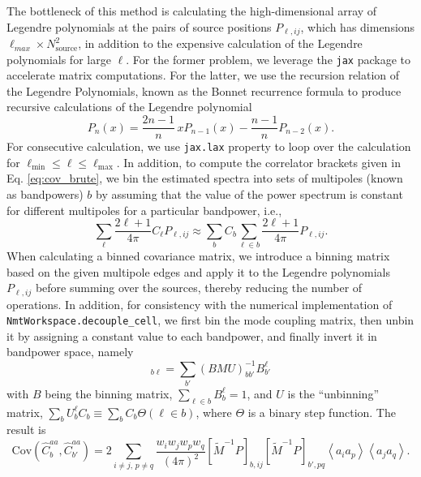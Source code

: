 \documentclass[%
 reprint,
superscriptaddress,
nofootinbib,
 amsmath,amssymb,
 aps,
 prd,
]{revtex4-2}
\begin{document}
The bottleneck of this method is calculating the high-dimensional array of Legendre polynomials at the pairs of source positions $P_{\ell, ij}$, which has dimensions $\ell_{max} \times N_{\text{source}}^2$, in addition to the expensive calculation of the Legendre polynomials for large $\ell$. For the former problem, we leverage the \texttt{jax} package to accelerate matrix computations. For the latter, we use the recursion relation of the Legendre Polynomials, known as the Bonnet recurrence formula  to produce recursive calculations of the Legendre polynomial \citep{Hademenos_Spiegel_Liu_2001}
\begin{equation}
    P_{n}(x) = \frac{2n-1}{n} \, x P_{n-1}(x) - \frac{n - 1}{n} P_{n-2}(x).
\end{equation}
For consecutive calculation, we use \texttt{jax.lax} property to loop over the calculation for $\ell_\mathrm{min} \leq \ell \leq \ell_\mathrm{max}$. In addition, to compute the correlator brackets given in Eq. \ref{eq:cov_brute}, we bin the estimated spectra into sets of multipoles (known as bandpowers) $b$ by assuming that the value of the power spectrum is constant for different multipoles for a particular bandpower, i.e.,
\begin{equation}
    \sum_{\ell} \frac{2\ell+1}{4\pi} C_\ell P_{\ell,ij}  \approx \sum_{b} C_b \sum_{\ell \in b} \frac{2\ell+1}{4\pi}  P_{\ell,ij}.
\end{equation}
When calculating a binned covariance matrix, we introduce a binning matrix based on the given multipole edges and apply it to the Legendre polynomials $P_{\ell, ij}$ before summing over the sources, thereby reducing the number of operations. In addition, for consistency with the numerical implementation of {\texttt{NmtWorkspace.decouple\_cell}}, we first bin the mode coupling matrix, then unbin it by assigning a constant value to each bandpower, and finally invert it in bandpower space, namely 
\begin{equation}
    [\mathcal{M}^{-1}]_{b\ell} = \sum_{b'}(B M U)^{-1}_{bb'} B^\ell_{b'}
\end{equation}
with $B$ being the binning matrix, $\sum_{\ell\in b}B_b^\ell=1$, and $U$ is the ``unbinning'' matrix, $\sum_b U^\ell_b C_b \equiv \sum_b C_b \Theta(\ell\in b)$, where $\Theta$ is a binary step function. The result is
\begin{equation}
    \mathrm{Cov}(\hat{C}_b^{aa}, \hat{C}_{b'}^{aa})  =  2
    \sum_{i \not= j,\, p \not= q}\frac{w_i w_jw_p w_q}{(4\pi)^2}   [\tilde{M}^{-1}P]_{b, ij} [\tilde{M}^{-1} P]_{b', pq}
     \left\langle a_i a_p \right\rangle \left\langle a_j a_q \right\rangle.
\end{equation}
\end{document}
